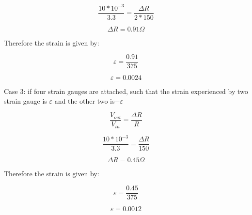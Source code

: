 \documentclass{article}
\begin{document}
\begin{equation*}
    \frac{10*10^{-3}}{3.3} = \frac{\Delta R}{ 2*150}
\end{equation*}

\begin{equation*}
    \Delta R = 0.91 \Omega
\end{equation*}

Therefore the strain is given by:

\begin{equation*}
    \varepsilon = \frac{0.91}{375}
\end{equation*}

\begin{equation*}
    \varepsilon = 0.0024
\end{equation*}

Case 3:
if four strain gauges are attached, such that the strain
experienced by two strain gauge is $\varepsilon$ and the other two is$ - \varepsilon$

\begin{equation*}
    \frac{V_{out}}{V_{in}} = \frac{\Delta R}{ R}
\end{equation*}

\begin{equation*}
    \frac{10*10^{-3}}{3.3} = \frac{\Delta R}{ 150}
\end{equation*}

\begin{equation*}
    \Delta R = 0.45 \Omega
\end{equation*}

Therefore the strain is given by:

\begin{equation*}
    \varepsilon = \frac{0.45}{375}
\end{equation*}

\begin{equation*}
    \varepsilon = 0.0012
\end{equation*}
\end{document}
